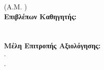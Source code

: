 
\thispagestyle{empty}

\begin{center}
    \vspace*{-0.5cm}
    {\Large \textbf{\thesisinstitution}} \\[0.2cm]
    {\large \textbf{\thesisschool}} \\[0.2cm]
    {\large \textbf{\thesisdepartment}} \\[1.8cm]
    
    {\LARGE \textbf{\thesistitleel}} \\[0.35cm]
    {\Large \textbf{\thesissubtitleel}} \\[1.5cm]
    
    {\Large \textbf{\thesistype}} \\[1.5cm]
    
    {\large \textbf{\thesisauthor}} \\[0.15cm]
    {\normalsize (Α.Μ. \thesisauthorid)} \\[1.8cm]
    
    \textbf{Επιβλέπων Καθηγητής:} \\[0.1cm]
    \thesissupervisor \\
    {\small \thesissupervisortitle} \\[0.6cm]
    
    \textbf{Μέλη Επιτροπής Αξιολόγησης:} \\[0.1cm]
    \thesiscommitteefirst \quad $\cdot$ \quad {\small \thesiscommitteefirsttitle} \\[0.1cm]
    \thesiscommitteesecond \quad $\cdot$ \quad {\small \thesiscommitteesecondtitle}
    
    \vfill
    {\normalsize \thesisdate}
\end{center}
